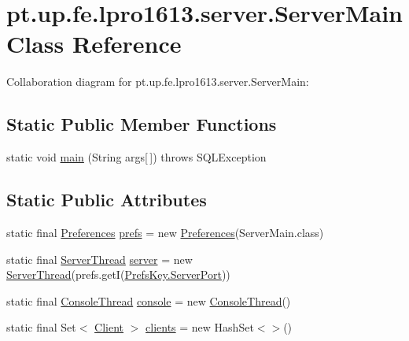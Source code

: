 \hypertarget{classpt_1_1up_1_1fe_1_1lpro1613_1_1server_1_1_server_main}{}\section{pt.\+up.\+fe.\+lpro1613.\+server.\+Server\+Main Class Reference}
\label{classpt_1_1up_1_1fe_1_1lpro1613_1_1server_1_1_server_main}


Collaboration diagram for pt.\+up.\+fe.\+lpro1613.\+server.\+Server\+Main\+:
\subsection*{Static Public Member Functions}
\begin{DoxyCompactItemize}
\item 
static void \hyperlink{classpt_1_1up_1_1fe_1_1lpro1613_1_1server_1_1_server_main_aa3501ccad0bb4a2f62168d8f84b12021}{main} (String args\mbox{[}$\,$\mbox{]})  throws S\+Q\+L\+Exception 
\end{DoxyCompactItemize}
\subsection*{Static Public Attributes}
\begin{DoxyCompactItemize}
\item 
static final \hyperlink{classpt_1_1up_1_1fe_1_1lpro1613_1_1sharedlib_1_1utils_1_1_preferences}{Preferences} \hyperlink{classpt_1_1up_1_1fe_1_1lpro1613_1_1server_1_1_server_main_af70c93d4f50a3f81c9edb159095f6b1c}{prefs} = new \hyperlink{classpt_1_1up_1_1fe_1_1lpro1613_1_1sharedlib_1_1utils_1_1_preferences}{Preferences}(Server\+Main.\+class)
\item 
static final \hyperlink{classpt_1_1up_1_1fe_1_1lpro1613_1_1server_1_1conn_1_1_server_thread}{Server\+Thread} \hyperlink{classpt_1_1up_1_1fe_1_1lpro1613_1_1server_1_1_server_main_a47b0d3f323dca42ff790cf040be6ce3a}{server} = new \hyperlink{classpt_1_1up_1_1fe_1_1lpro1613_1_1server_1_1conn_1_1_server_thread}{Server\+Thread}(prefs.\+getI(\hyperlink{enumpt_1_1up_1_1fe_1_1lpro1613_1_1server_1_1other_1_1_prefs_key_a92ee06ea77e828cd8272275f9309e142}{Prefs\+Key.\+Server\+Port}))
\item 
static final \hyperlink{classpt_1_1up_1_1fe_1_1lpro1613_1_1server_1_1other_1_1_console_thread}{Console\+Thread} \hyperlink{classpt_1_1up_1_1fe_1_1lpro1613_1_1server_1_1_server_main_af9f54f997c78d9974b788b66d05c4c2c}{console} = new \hyperlink{classpt_1_1up_1_1fe_1_1lpro1613_1_1server_1_1other_1_1_console_thread}{Console\+Thread}()
\item 
static final Set$<$ \hyperlink{classpt_1_1up_1_1fe_1_1lpro1613_1_1server_1_1conn_1_1_client}{Client} $>$ \hyperlink{classpt_1_1up_1_1fe_1_1lpro1613_1_1server_1_1_server_main_ad123167652dd573c163e4951b9eeada9}{clients} = new Hash\+Set$<$$>$()
\end{DoxyCompactItemize}


